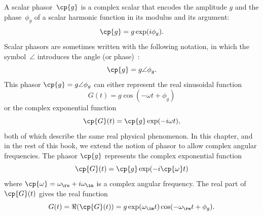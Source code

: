 A scalar phasor~$\cp{g}$ is a complex scalar that encodes the amplitude $g$ and the phase~$\phi_g$ of a scalar harmonic function in its modulus and its argument:
\begin{equation}
    \cp{g} = g \exp(i \phi_g)
    \text{.}
\end{equation}
Scalar phasors are sometimes written with the following notation, in which the symbol~$\angle$ introduces the angle (or phase)~\cite{nilsson2007electric}:
\begin{equation}
    \cp{g} = g \angle \phi_g
    \text{.}
\end{equation}
This phasor $\cp{g} = g \angle \phi_g$
can either represent the real sinusoidal function
\begin{equation}
    G(t) = g \cos(-\omega t + \phi_g)
\end{equation}
or the complex exponential function
\begin{equation}
    \cp{G}(t) = \cp{g} \exp(-i \omega t)
    \text{,}
\end{equation}
both of which describe the same real physical phenomenon.
In this chapter, and in the rest of this book, we extend the notion of phasor to allow complex angular frequencies.
The phasor $\cp{g}$ represents the complex exponential function
\begin{equation}
    \cp{G}(t) = \cp{g} \exp(-i \cp{\omega} t)
\end{equation}
where $\cp{\omega} = \omega_\re + i \omega_\im$ is a complex angular frequency.
The real part of $\cp{G}(t)$ gives the real function
\begin{equation}
    G(t) = \Re(\cp{G}(t)) = g \exp(\omega_\im t) \cos(- \omega_\re t + \phi_g)
    \text{.}
\end{equation}

